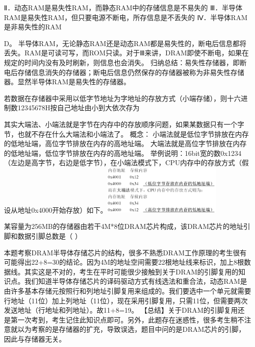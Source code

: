 Ⅱ．动态RAM是易失性RAM，而静态RAM中的存储信息是不易失的
Ⅲ．半导体RAM是易失性RAM，但只要电源不断电，所存信息是不丢失的
Ⅳ．半导体RAM是非易失性的RAM
\par{}
\begin{solution}D。
半导体RAM，无论静态RAM还是动态RAM都是易失性的，断电后信息都将丢失。RAM是可读可写，而ROM只读。对于Ⅲ来讲，DRAM即使不断电，如果在规定的时间内没有及时刷新，则信息也会消失。
归纳总结：易失性存储器，即断电后存储信息消失的存储器；断电后信息仍然保存的存储器被称为非易失性存储器。显然半导体RAM是易失性的存储器。
\end{solution}
\question 若数据在存储器中采用以低字节地址为字地址的存放方式（小端存储），则十六进制数12345678H按自己地址由小到大依次存为
\par{}
\begin{solution}其实大端法、小端法就是字节在内存中的存放顺序问题，如果某数据只有一个字节，也就不存在什么大端法和小端法了。
概念：
小端法就是低位字节排放在内存的低地址端，高位字节排放在内存的高地址端。
大端法就是高位字节排放在内存的低地址端，低位字节排放在内存的高地址端。
举例说明：16bit宽的数0x1234（左边是高字节，右边是低字节），在小端法模式下，CPU内存中的存放方式（假设从地址0x4000开始存放）如下。\includegraphics[width=2.31250in,height=0.95833in]{computerassets/EF77748026784D6F780F5F685958E7B8.png}
\end{solution}
\question 某容量为256MB的存储器由若干4M*8位DRAM芯片构成，该DRAM芯片的地址引脚和数据引脚总数是（
）
\par{}
\begin{solution}本题考察DRAM半导体存储芯片的结构，很多不熟悉DRAM工作原理的考生很有可能得出22+8=30的结论。因为4M的地址空间需要22根地址线来标识，加上8根数据线。其实这是不对的，考生在平时可能很少接触到关于DRAM的引脚复用的知识点。我们知道半导体存储芯片的译码驱动方式有线选法和重合法，动态RAM是由许多基本存储元按照行和列地址引脚复用来组成的。我们要选中一个单元就需要行地址（11位）加上列地址（11位），现在采用引脚复用，只需11位，但需要两次发送地址（行地址和列地址）。故11+8=19。
【总结】关于DRAM的引脚复用还是第一次考到，考生记住此知识点即可。另外，此题存在迷惑性，很多考生稍不注意就以为考察的是存储器的扩充，导致误选，题目中问的是DRAM芯片的引脚，因此与存储器无关。
\end{solution}
